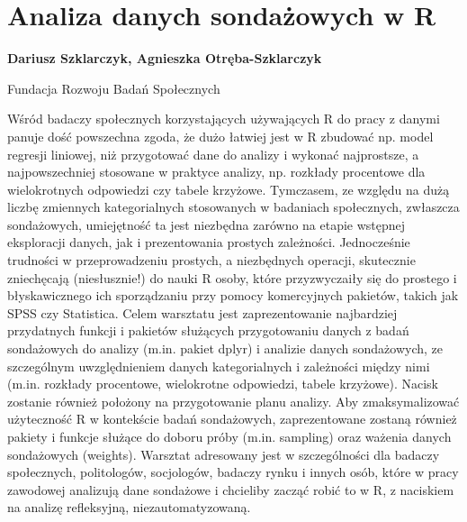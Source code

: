 \documentclass[\main/boa.tex]{subfiles}
\begin{document}
\section{Analiza danych sondażowych w R}

\begin{minipage}{0.915\textwidth}
\centering
{\bf {} Dariusz Szklarczyk,  Agnieszka Otręba-Szklarczyk}
\end{minipage}

\vskip 0.3cm

\begin{affiliations}
\begin{minipage}{0.915\textwidth}
\centering
\large Fundacja Rozwoju Badań Społecznych  \\[2pt]
\end{minipage}
\end{affiliations}

\vskip 0.8cm

\opiswarsztatu Wśród badaczy społecznych korzystających używających R do pracy z danymi panuje dość powszechna zgoda, że dużo łatwiej jest w R zbudować np. model regresji liniowej, niż przygotować dane do analizy i wykonać najprostsze, a najpowszechniej stosowane w praktyce analizy, np. rozkłady procentowe dla wielokrotnych odpowiedzi czy tabele krzyżowe. Tymczasem, ze względu na dużą liczbę zmiennych kategorialnych stosowanych w badaniach społecznych, zwłaszcza sondażowych, umiejętność ta jest niezbędna zarówno na etapie wstępnej eksploracji danych, jak i prezentowania prostych zależności. Jednocześnie trudności w przeprowadzeniu prostych, a niezbędnych operacji, skutecznie zniechęcają (niesłusznie!) do nauki R osoby, które przyzwyczaiły się do prostego i błyskawicznego ich sporządzaniu przy pomocy komercyjnych pakietów, takich jak SPSS czy Statistica. Celem warsztatu jest zaprezentowanie najbardziej przydatnych funkcji i pakietów służących przygotowaniu danych z badań sondażowych do analizy (m.in. pakiet dplyr) i analizie danych sondażowych, ze szczególnym uwzględnieniem danych kategorialnych i zależności między nimi (m.in. rozkłady procentowe, wielokrotne odpowiedzi, tabele krzyżowe). Nacisk zostanie również położony na przygotowanie planu analizy. Aby zmaksymalizować użyteczność R w kontekście badań sondażowych, zaprezentowane zostaną również pakiety i funkcje służące do doboru próby (m.in. sampling) oraz ważenia danych sondażowych (weights). Warsztat adresowany jest w szczególności dla badaczy społecznych, politologów, socjologów, badaczy rynku i innych osób, które w pracy zawodowej analizują dane sondażowe i chcieliby zacząć robić to w R, z naciskiem na analizę refleksyjną, niezautomatyzowaną.
\end{document}
